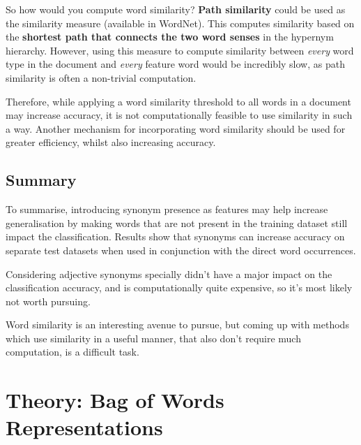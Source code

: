 \documentclass{article}
\begin{document}
So how would you compute word similarity? \textbf{Path similarity} could be used as the similarity measure (available in WordNet). This computes similarity based on the \textbf{shortest path that connects the two word senses} in the hypernym hierarchy. However, using this measure to compute similarity between \textit{every} word type in the document and \textit{every} feature word would be incredibly slow, as path similarity is often a non-trivial computation.

Therefore, while applying a word similarity threshold to all words in a document may increase accuracy, it is not computationally feasible to use similarity in such a way. Another mechanism for incorporating word similarity should be used for greater efficiency, whilst also increasing accuracy.

\subsection{Summary}

To summarise, introducing synonym presence as features may help increase generalisation by making words that are not present in the training dataset still impact the classification. Results show that synonyms can increase accuracy on separate test datasets when used in conjunction with the direct word occurrences.

Considering adjective synonyms specially didn't have a major impact on the classification accuracy, and is computationally quite expensive, so it's most likely not worth pursuing.

Word similarity is an interesting avenue to pursue, but coming up with methods which use similarity in a useful manner, that also don't require much computation, is a difficult task.

\section{Theory: Bag of Words Representations}
\end{document}
